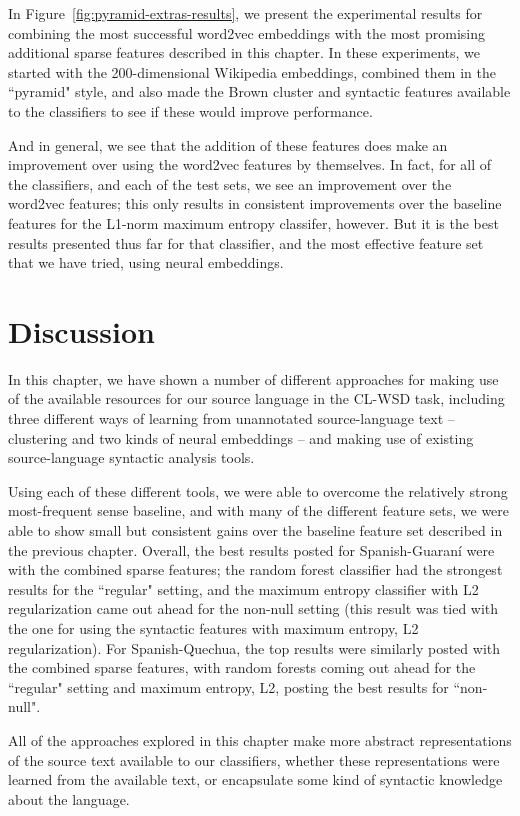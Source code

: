 In Figure~\ref{fig:pyramid-extras-results}, we present the experimental results
for combining the most successful word2vec embeddings with the most promising
additional sparse features described in this chapter. In these experiments, we
started with the 200-dimensional Wikipedia embeddings, combined them in the
``pyramid" style, and also made the Brown cluster and syntactic features
available to the classifiers to see if these would improve performance.

And in general, we see that the addition of these features does make an
improvement over using the word2vec features by themselves. In fact, for all of
the classifiers, and each of the test sets, we see an improvement over the
word2vec features; this only results in consistent improvements over the
baseline features for the L1-norm maximum entropy classifer, however. But it is
the best results presented thus far for that classifier, and the most effective
feature set that we have tried, using neural embeddings.

\section{Discussion}
In this chapter, we have shown a number of different approaches for making use
of the available resources for our source language in the CL-WSD task,
including three different ways of learning from unannotated source-language
text -- clustering and two kinds of neural embeddings -- and making use of
existing source-language syntactic analysis tools.

Using each of these different tools, we were able to overcome the relatively
strong most-frequent sense baseline, and with many of the different feature
sets, we were able to show small but consistent gains over the baseline feature
set described in the previous chapter. Overall, the best results posted for
Spanish-Guaraní were with the combined sparse features; the random forest
classifier had the strongest results for the ``regular" setting, and the
maximum entropy classifier with L2 regularization came out ahead for the
non-null setting (this result was tied with the one for using the syntactic
features with maximum entropy, L2 regularization). 
For Spanish-Quechua, the top results were similarly posted with the combined
sparse features, with random forests coming out ahead for the ``regular"
setting and maximum entropy, L2, posting the best results for ``non-null".

All of the approaches explored in this chapter make more abstract
representations of the source text available to our classifiers, whether these
representations were learned from the available text, or encapsulate some kind
of syntactic knowledge about the language.

